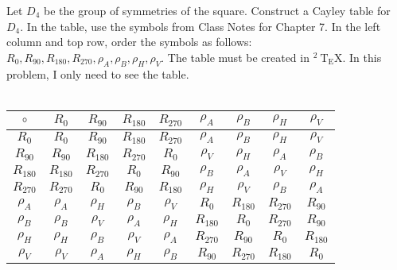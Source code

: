 \documentclass[12pt]{article}
\newenvironment{problem}[2][Problem]{\begin{trivlist}
\item[\hskip \labelsep {\bfseries #1}\hskip \labelsep {\bfseries #2.}]}{\end{trivlist}}
\begin{document}
\begin{problem}{3}
Let $D_{4}$ be the group of symmetries of the square. Construct a Cayley table for $D_{4}$. In the table, use the symbols from Class Notes for Chapter 7. In the left column and top row, order the symbols as follows: $R_{0}, R_{90}, R_{180}, R_{270}, \rho_{A}, \rho_{B}, \rho_{H}, \rho_{V}$. The table must be created in ${ }^{2} \mathrm{~T}_{\mathrm{E}} \mathrm{X}$. In this problem, I only need to see the table.
\\
\\
	\begin{tabular}{|c|c|c|c|c|c|c|c|c|}
	\hline
	\( \circ \)    & \(R_{0}\) & \(R_{90}\) & \(R_{180}\) & \(R_{270}\) & \(\rho_A\) & \(\rho_B\) & \(\rho_H\) & \(\rho_V\) \\
	\hline
	\(R_{0}\) & \(R_{0}\)  & \(R_{90}\)  & \(R_{180}\)  & \(R_{270}\)  & \(\rho_A\)  & \(\rho_B\)  & \(\rho_H\)  & \(\rho_V\)  \\
	\hline
	\(R_{90}\) & \(R_{90}\) & \(R_{180}\) & \(R_{270}\)  & \(R_{0}\)    & \(\rho_V\)  & \(\rho_H\)  & \(\rho_A\)  & \(\rho_B\)  \\
	\hline
	\(R_{180}\) & \(R_{180}\) & \(R_{270}\) & \(R_{0}\)    & \(R_{90}\)   & \(\rho_B\)  & \(\rho_A\)  & \(\rho_V\)  & \(\rho_H\)  \\
	\hline
	\(R_{270}\) & \(R_{270}\) & \(R_{0}\)   & \(R_{90}\)   & \(R_{180}\)  & \(\rho_H\)  & \(\rho_V\)  & \(\rho_B\)  & \(\rho_A\)  \\
	\hline
	\(\rho_A\)  & \(\rho_A\) & \(\rho_H\)   & \(\rho_B\)    & \(\rho_V\)    & \(R_{0}\)  & \(R_{180}\) & \(R_{270}\) & \(R_{90}\) \\
	\hline
	\(\rho_B\)  & \(\rho_B\) & \(\rho_V\)   & \(\rho_A\)    & \(\rho_H\)    & \(R_{180}\) & \(R_{0}\)  & \(R_{270}\) & \(R_{90}\) \\
	\hline
	\(\rho_H\)  & \(\rho_H\) & \(\rho_B\)   & \(\rho_V\)    & \(\rho_A\)    & \(R_{270}\) & \(R_{90}\) & \(R_{0}\)  & \(R_{180}\) \\
	\hline
	\(\rho_V\)  & \(\rho_V\) & \(\rho_A\)   & \(\rho_H\)    & \(\rho_B\)    & \(R_{90}\) & \(R_{270}\) & \(R_{180}\)  & \(R_{0}\)  \\
	\hline
	\end{tabular}
\end{problem}
\end{document}
